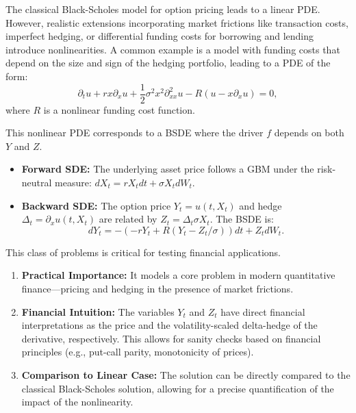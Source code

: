 \begin{definition}
The classical Black-Scholes model for option pricing leads to a linear PDE. However, realistic extensions incorporating market frictions like transaction costs, imperfect hedging, or differential funding costs for borrowing and lending introduce nonlinearities. A common example is a model with funding costs that depend on the size and sign of the hedging portfolio, leading to a PDE of the form:
\begin{equation}
    \partial_t u + r x \partial_x u + \frac{1}{2}\sigma^2 x^2 \partial_{xx}^2 u - R(u - x\partial_x u) = 0,
\end{equation}
where \(R\) is a nonlinear funding cost function.
\end{definition}

\begin{proposition}
This nonlinear PDE corresponds to a BSDE where the driver \(f\) depends on both \(Y\) and \(Z\).
\begin{itemize}
    \item \textbf{Forward SDE:} The underlying asset price follows a GBM under the risk-neutral measure: \(dX_t = r X_t dt + \sigma X_t dW_t\).
    \item \textbf{Backward SDE:} The option price \(Y_t = u(t,X_t)\) and hedge \(\Delta_t = \partial_x u(t,X_t)\) are related by \(Z_t = \Delta_t \sigma X_t\). The BSDE is:
    \[ dY_t = -(-r Y_t + R(Y_t - Z_t/\sigma))dt + Z_t dW_t. \]
\end{itemize}
\end{proposition}

\begin{remark}
This class of problems is critical for testing financial applications.
\begin{enumerate}
    \item \textbf{Practical Importance:} It models a core problem in modern quantitative finance—pricing and hedging in the presence of market frictions.
    \item \textbf{Financial Intuition:} The variables \(Y_t\) and \(Z_t\) have direct financial interpretations as the price and the volatility-scaled delta-hedge of the derivative, respectively. This allows for sanity checks based on financial principles (e.g., put-call parity, monotonicity of prices).
    \item \textbf{Comparison to Linear Case:} The solution can be directly compared to the classical Black-Scholes solution, allowing for a precise quantification of the impact of the nonlinearity.
\end{enumerate}
\end{remark}

